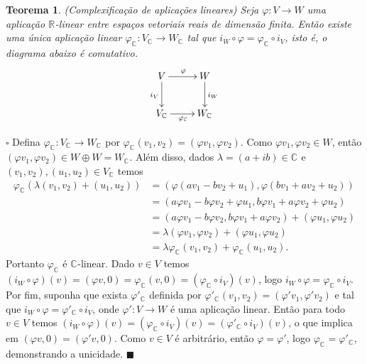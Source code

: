 \documentclass[12pt]{book}
\newtheorem{teorema}{Teorema}[section]
\newenvironment{prova}[1]{$\square$ #1}{\hfill$\blacksquare$}
\newcommand{\complexificacao}[1]{#1_{\complexo{}}}
\newcommand{\complexo}[1]{\mathbb{C}^{#1}}
\newcommand{\real}[1]{\mathbb{R}^{#1}}
\newcommand{\reta}{\real{}}
\begin{document}
	\begin{teorema}
		(Complexificação de aplicações lineares) Seja $\varphi : V \to W$ uma aplicação
		$\reta$-linear entre espaços vetoriais reais de dimensão finita. Então existe uma única aplicação linear $\complexificacao{\varphi}:\complexificacao{V} \to \complexificacao{W}$ tal que $i_{W}\circ \varphi = \complexificacao{\varphi} \circ i_{V}$, isto é, o diagrama abaixo é comutativo.
		$$
		\xymatrix{
			V\ar[d]_{i_{V}}\ar[r]^{\varphi} & W\ar[d]^{i_{W}} 
			\\
			\complexificacao{V} \ar[r]_{\complexificacao{\varphi}}&\complexificacao{W} 
		}
		$$
	\end{teorema}
	\begin{prova}
		Defina $\complexificacao{\varphi}:\complexificacao{V} \to \complexificacao{W}$ por $\complexificacao{\varphi}(v_{1}, v_{2}) = (\varphi v_{1}, \varphi v_{2})$. Como $\varphi v_{1}, \varphi v_{2} \in W$, então $(\varphi v_{1}, \varphi v_{2}) \in W\oplus W = \complexificacao{W}$. Além disso, dados $\lambda = (a+ib)\in \complexo{}$ e $(v_{1}, v_{2}), (u_{1}, u_{2})\in \complexificacao{V}$ temos 
		$$
		\begin{aligned}
		\complexificacao{\varphi} (\lambda(v_{1}, v_{2}) + (u_{1}, u_{2})) 
		&= (\varphi(a v_{1} - bv_{2} + u_{1}), \varphi(b v_{1}+a v_{2} + u_{2}))
		\\
		&=(a\varphi v_{1} - b\varphi v_{2} + \varphi u_{1}, b\varphi v_{1}+a\varphi v_{2} + \varphi u_{2})
		\\
		&=(a\varphi v_{1} - b\varphi v_{2} , b\varphi v_{1}+a\varphi v_{2} )+(\varphi u_{1},\varphi u_{2})
		\\
		&=\lambda(\varphi v_{1},\varphi v_{2})+(\varphi u_{1},\varphi u_{2})
		\\
		&=\lambda 	\complexificacao{\varphi} (v_{1},v_{2})+\complexificacao{\varphi} (u_{1},u_{2}).
		\end{aligned}
		$$
		Portanto $\complexificacao{\varphi}$ é $\complexo{}$-linear. Dado $v \in V$ temos $(i_{W}\circ \varphi)(v) = (\varphi v,0) = \complexificacao{\varphi}(v,0) = (\complexificacao{\varphi} \circ i_{V})(v)$, logo $i_{W}\circ \varphi =\complexificacao{\varphi} \circ i_{V}$. Por fim, suponha que exista $\complexificacao{\varphi'} $ definida por $\complexificacao{\varphi'}(v_{1}, v_{2}) = (\varphi' v_{1}, \varphi' v_{2})$ e tal que $i_{W}\circ \varphi =\complexificacao{\varphi'} \circ i_{V}$, onde $\varphi':V\to W$ é uma aplicação linear. Então para todo $v \in V$ temos $(i_{W}\circ \varphi )(v)=(\complexificacao{\varphi} \circ i_{V})(v) = (\complexificacao{\varphi'} \circ i_{V})(v)$, o que implica em $(\varphi v, 0) = (\varphi' v, 0)$. Como $v \in V$ é arbitrário, então $\varphi = \varphi'$, logo $\complexificacao{\varphi} = \complexificacao{\varphi'}$, demonstrando a unicidade. 
	\end{prova}
	
\end{document}
